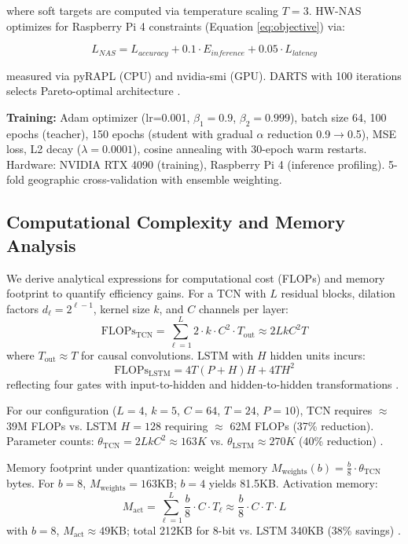 \documentclass[12pt,a4paper]{article}
\begin{document}
where soft targets are computed via temperature scaling $T=3$. HW-NAS optimizes for Raspberry Pi 4 constraints (Equation \ref{eq:objective}) via:

\begin{equation}
\label{eq:nas}
L_{NAS} = L_{accuracy} + 0.1 \cdot E_{inference} + 0.05 \cdot L_{latency}
\end{equation}

measured via pyRAPL (CPU) and nvidia-smi (GPU). DARTS with 100 iterations selects Pareto-optimal architecture \citep{wu2023kdfed, chitty2022hwnas}.

\textbf{Training:} Adam optimizer (lr=0.001, $\beta_1=0.9$, $\beta_2=0.999$), batch size 64, 100 epochs (teacher), 150 epochs (student with gradual $\alpha$ reduction 0.9$\to$0.5), MSE loss, L2 decay ($\lambda=0.0001$), cosine annealing with 30-epoch warm restarts. Hardware: NVIDIA RTX 4090 (training), Raspberry Pi 4 (inference profiling). 5-fold geographic cross-validation with ensemble weighting.

\subsection{Computational Complexity and Memory Analysis}

We derive analytical expressions for computational cost (FLOPs) and memory footprint to quantify efficiency gains. For a TCN with $L$ residual blocks, dilation factors $d_\ell = 2^{\ell-1}$, kernel size $k$, and $C$ channels per layer:
\begin{equation}
\text{FLOPs}_{\text{TCN}} = \sum_{\ell=1}^{L} 2 \cdot k \cdot C^2 \cdot T_{\text{out}} \approx 2LkC^2T
\end{equation}
where $T_{\text{out}} \approx T$ for causal convolutions. LSTM with $H$ hidden units incurs:
\begin{equation}
\text{FLOPs}_{\text{LSTM}} = 4T(P+H)H + 4TH^2
\end{equation}
reflecting four gates with input-to-hidden and hidden-to-hidden transformations \citep{luo2024moderntcn, chen2020prob}.

For our configuration ($L=4$, $k=5$, $C=64$, $T=24$, $P=10$), TCN requires $\approx$ 39M FLOPs vs. LSTM $H=128$ requiring $\approx$ 62M FLOPs (37\% reduction). Parameter counts: $\theta_{\text{TCN}} = 2LkC^2 \approx 163K$ vs. $\theta_{\text{LSTM}} \approx 270K$ (40\% reduction) \citep{lin2021tcan}.

Memory footprint under quantization: weight memory $M_{\text{weights}}(b) = \frac{b}{8} \cdot \theta_{\text{TCN}}$ bytes. For $b=8$, $M_{\text{weights}} = 163$KB; $b=4$ yields 81.5KB. Activation memory:
\begin{equation}
M_{\text{act}} = \sum_{\ell=1}^{L} \frac{b}{8} \cdot C \cdot T_{\ell} \approx \frac{b}{8} \cdot C \cdot T \cdot L
\end{equation}
with $b=8$, $M_{\text{act}} \approx 49$KB; total 212KB for 8-bit vs. LSTM 340KB (38\% savings) \citep{wandb2025qat}.
\end{document}
